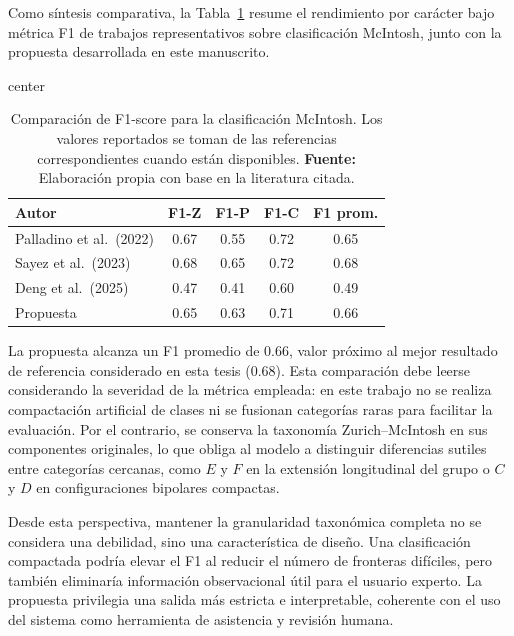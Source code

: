 Como síntesis comparativa, la Tabla~\ref{tab:comparativa-baselines} resume el
rendimiento por carácter bajo métrica F1 de trabajos representativos sobre
clasificación McIntosh, junto con la propuesta desarrollada en este manuscrito.

\begin{table}[H]
\centering
\caption{Comparación de F1-score para la clasificación McIntosh. Los valores
reportados se toman de las referencias correspondientes cuando están
disponibles. \textbf{Fuente:} Elaboración propia con base en la literatura citada.}
\label{tab:comparativa-baselines}
{\uniformtablestyle
\setlength{\tabcolsep}{7pt}
\begin{adjustbox}{center}
\begin{tabular}{lcccc}
\toprule
\textbf{Autor} & \textbf{F1-Z} & \textbf{F1-P} & \textbf{F1-C} & \textbf{F1 prom.} \\
\midrule
Palladino et al.\ (2022) \citep{palladino2022sunspot} & 0.67 & 0.55 & 0.72 & 0.65 \\
Sayez et al.\ (2023) \citep{sayez2023sunscc} & 0.68 & 0.65 & 0.72 & 0.68 \\
Deng et al.\ (2025) \citep{deng2025mcintosh} & 0.47 & 0.41 & 0.60 & 0.49 \\
Propuesta & 0.65 & 0.63 & 0.71 & 0.66 \\
\bottomrule
\end{tabular}
\end{adjustbox}
}
\end{table}

La propuesta alcanza un F1 promedio de $0.66$, valor próximo al mejor resultado
de referencia considerado en esta tesis ($0.68$). Esta comparación debe leerse
considerando la severidad de la métrica empleada: en este trabajo no se realiza
compactación artificial de clases ni se fusionan categorías raras para facilitar
la evaluación. Por el contrario, se conserva la taxonomía Zurich--McIntosh en sus
componentes originales, lo que obliga al modelo a distinguir diferencias sutiles
entre categorías cercanas, como $E$ y $F$ en la extensión longitudinal del grupo
o $C$ y $D$ en configuraciones bipolares compactas.

Desde esta perspectiva, mantener la granularidad taxonómica completa no se
considera una debilidad, sino una característica de diseño. Una clasificación
compactada podría elevar el F1 al reducir el número de fronteras difíciles, pero
también eliminaría información observacional útil para el usuario experto. La
propuesta privilegia una salida más estricta e interpretable, coherente con el
uso del sistema como herramienta de asistencia y revisión humana.

